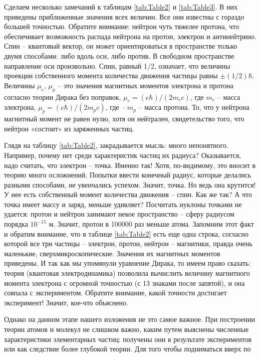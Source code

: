 \begin{multicols}{2}
\par
Сделаем несколько замечаний к таблицам \ref{tab:Table2} и \ref{tab:Table3}. В них
приведены приближенные значения всех величин. Все
они известны с гораздо большей точностью. Обратите
внимание: нейтрон чуть тяжелее протона, что обеспечивает возможность распада нейтрона на протон, электрон и антинейтрино. Спин – квантовый вектор, он
может ориентироваться в пространстве только двумя
способами: либо вдоль оси, либо против. В свободном
пространстве направление оси произвольно. Спин,
равный 1/2, означает, что величины проекции собственного момента количества движения частицы равны
$\pm(1/2)\hbar$\>. Величины $\mu_e$, $\mu_p$ – это значения магнитных моментов электрона и протона согласно теории Дирака без поправок, $\mu_e=(e\hbar)/(2m_ec)$, где $m_e$ – масса
электрона, $\mu_p=(e\hbar)/(2m_pc)$, где – $m_p$ – масса протона.
То, что у нейтрона магнитный момент не равен нулю,
хотя он нейтрален, свидетельство того, что нейтрон
«состоит» из заряженных частиц.
\par
Глядя на таблицу \ref{tab:Table2}, закрадывается мысль: много
непонятного. Например, почему нет среди характеристик частиц их радиуса? Оказывается, надо считать,
что электрон – точка. Именно так! Хотя, по-видимому,
это вносит в теорию много осложнений. Попытки
ввести конечный радиус, которые делались разными
способами, не увенчались успехом. Значит, точка. Но
ведь она крутится! У нее есть собственный момент
количества движения – спин. Как же так? А что точка
имеет массу и заряд, меньше удивляет? Посчитать
нуклоны точками не удается: протон и нейтрон занимают некое пространство – сферу радиусом порядка $10^{-15}$ м. Значит, протон в 100000 раз меньше атома.
Запомним этот факт и обратим внимание, что в таблице
\ref{tab:Table2} есть еще одна строка, согласно которой все три
частицы – электрон, протон, нейтрон – магнитики,
правда очень маленькие, сверхмикроскопические. Значения их магнитных моментов приведены. И так как
мы упомянули уравнение Дирака, то имеем право
сказать: теория (квантовая электродинамика) позволила вычислить величину магнитного момента электрона с огромной точностью (с 13 знаками после запятой), и она совпала с экспериментом. Обратите внимание, какой точности достигает эксперимент! Значит,
кое-что объяснено.
\par
Однако на данном этапе нашего изложения не это
самое важное. При построении теории атомов и молекул
не слишком важно, каким путем выяснены численные
характеристики элементарных частиц: получены они в
результате экспериментов или как следствие более
глубокой теории. Для того чтобы подниматься вверх по

\end{multicols}
